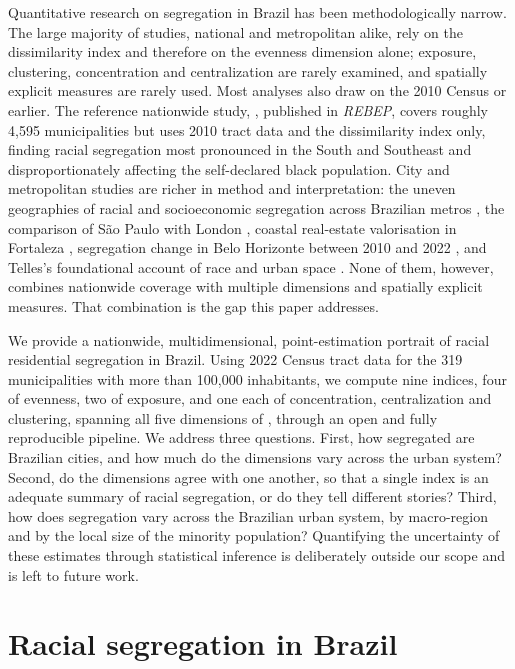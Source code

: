 \documentclass[12pt,a4paper]{article}
\begin{document}
Quantitative research on segregation in Brazil has been methodologically narrow. The large majority of studies, national and metropolitan alike, rely on the dissimilarity index and therefore on the evenness dimension alone; exposure, clustering, concentration and centralization are rarely examined, and spatially explicit measures are rarely used. Most analyses also draw on the 2010 Census or earlier. The reference nationwide study, \citet{deSouza2023nationwide_english}, published in \emph{REBEP}, covers roughly 4{,}595 municipalities but uses 2010 tract data and the dissimilarity index only, finding racial segregation most pronounced in the South and Southeast and disproportionately affecting the self-declared black population. City and metropolitan studies are richer in method and interpretation: the uneven geographies of racial and socioeconomic segregation across Brazilian metros \citep{barros2018unevengeographies}, the comparison of S\~ao Paulo with London \citep{barros2024saopaulolondres}, coastal real-estate valorisation in Fortaleza \citep{danilofranca2022fortaleza}, segregation change in Belo Horizonte between 2010 and 2022 \citep{strauch2026bh20102022}, and Telles's foundational account of race and urban space \citep{telles2004race}. None of them, however, combines nationwide coverage with multiple dimensions and spatially explicit measures. That combination is the gap this paper addresses.

We provide a nationwide, multidimensional, point-estimation portrait of racial residential segregation in Brazil. Using 2022 Census tract data for the 319 municipalities with more than 100{,}000 inhabitants, we compute nine indices, four of evenness, two of exposure, and one each of concentration, centralization and clustering, spanning all five dimensions of \citet{massey1988dimensions}, through an open and fully reproducible pipeline. We address three questions. First, how segregated are Brazilian cities, and how much do the dimensions vary across the urban system? Second, do the dimensions agree with one another, so that a single index is an adequate summary of racial segregation, or do they tell different stories? Third, how does segregation vary across the Brazilian urban system, by macro-region and by the local size of the minority population? Quantifying the uncertainty of these estimates through statistical inference is deliberately outside our scope and is left to future work.

\section{Racial segregation in Brazil}\label{sec:brazil}
\end{document}
